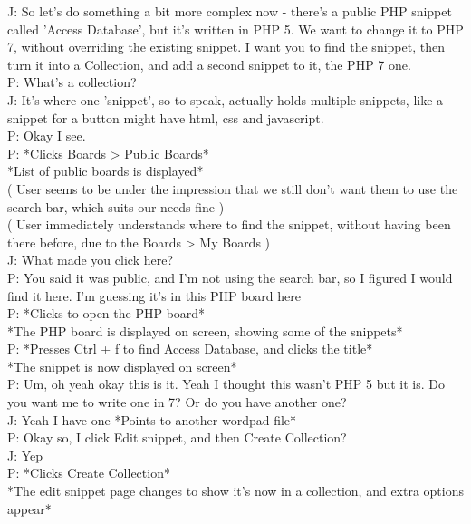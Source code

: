J: \-\hspace{1.4cm}So let's do something a bit more complex now - there's a public PHP snippet called 'Access Database', but it's written in PHP 5. We want to change it to PHP 7, without overriding the existing snippet. I want you to find the snippet, then turn it into a Collection, and add a second snippet to it, the PHP 7 one. \\
P: What's a collection? \\
J: \-\hspace{1.4cm}It's where one 'snippet', so to speak, actually holds multiple snippets, like a snippet for a button might have html, css and javascript. \\
P: Okay I see. \\
P: *Clicks Boards > Public Boards* \\
*List of public boards is displayed* \\
( User seems to be under the impression that we still don't want them to use the search bar, which suits our needs fine ) \\
( User immediately understands where to find the snippet, without having been there before, due to the Boards > My Boards ) \\
J: \-\hspace{1.4cm}What made you click here? \\
P: You said it was public, and I'm not using the search bar, so I figured I would find it here. I'm guessing it's in this PHP board here \\
P: *Clicks to open the PHP board* \\
*The PHP board is displayed on screen, showing some of the snippets* \\
P: *Presses Ctrl + f to find Access Database, and clicks the title* \\
*The snippet is now displayed on screen* \\
P: Um, oh yeah okay this is it. Yeah I thought this wasn't PHP 5 but it is. Do you want me to write one in 7? Or do you have another one? \\
J: \-\hspace{1.4cm}Yeah I have one *Points to another wordpad file* \\
P: Okay so, I click Edit snippet, and then Create Collection? \\
J: \-\hspace{1.4cm}Yep \\
P: *Clicks Create Collection* \\
*The edit snippet page changes to show it's now in a collection, and extra options appear* \\
